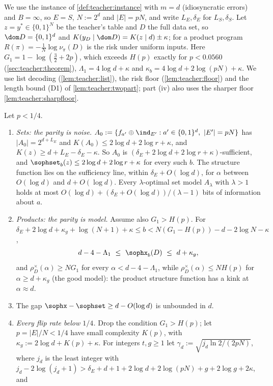 We use the instance of \cref{def:teacher:instance} with $m=d$ (idiosyncratic errors) and $B=\infty$, so $E=S$, $N:=2^d$ and $|E|=pN$, and write $L_E,\delta_E$ for $L_S,\delta_S$. Let $z=y^*\in\{0,1\}^N$ be the teacher's table and $D$ the full data set, so $\dom D=\{0,1\}^d$ and $K(y_D\mid\dom D)=K(z\mid d)\pm\kappa$; for a product program $R(\pi)=-\frac1N\log\nu_\pi(D)$ is the risk under uniform inputs. Here $G_1=1-\log(\frac32+2p)$, which exceeds $H(p)$ exactly for $p<0.0560$ (\cref{sec:teacher:theorem}), $\Lambda_1=4\log d+\kappa$ and $\kappa_b=4\log d+2\log(pN)+\kappa$. We use list decoding (\cref{lem:teacher:list}), the risk floor (\cref{lem:teacher:floor}) and the length bound (D1) of \cref{lem:teacher:twopart}; part (iv) also uses the sharper floor \cref{lem:teacher:sharpfloor}.

\begin{proposition}\label{prop:algstat:parity}
Let $p<1/4$.
\begin{enumerate}[label=(\roman*)]
\item \emph{Sets: the parity is noise.} $A_0:=\{f_{a'}\oplus\ind_{E'}:a'\in\{0,1\}^d,\ |E'|=pN\}$ has $|A_0|=2^{d+L_E}$ and $K(A_0)\le2\log d+2\log r+\kappa$, and $K(z)\ge d+L_E-\delta_E-\kappa$. So $A_0$ is $(\delta_E+2\log d+2\log r+\kappa)$-sufficient, and $\sophset_b(z)\le2\log d+2\log r+\kappa$ for every such $b$. The structure function lies on the sufficiency line, within $\delta_E+O(\log d)$, for $\alpha$ between $O(\log d)$ and $d+O(\log d)$. Every $\lambda$-optimal set model $A_\lambda$ with $\lambda>1$ holds at most $O(\log d)+(\delta_E+O(\log d))/(\lambda-1)$ bits of information about $a$.
\item \emph{Products: the parity is model.} Assume also $G_1>H(p)$. For $\delta_E+2\log d+\kappa_g+\log(N+1)+\kappa\le b<N(G_1-H(p))-d-2\log N-\kappa$,
\[
d-4-\Lambda_1\ \le\ \sophx_b(D)\ \le\ d+\kappa_g,
\]
and $\rho^\times_D(\alpha)\ge NG_1$ for every $\alpha<d-4-\Lambda_1$, while $\rho^\times_D(\alpha)\le NH(p)$ for $\alpha\ge d+\kappa_g$ (the good model): the product structure function has a kink at $\alpha\approx d$.
\item The gap $\sophx-\sophset\ge d-O(\log d)$ is unbounded in $d$.
\item \emph{Every flip rate below $1/4$.} Drop the condition $G_1>H(p)$; let $p=|E|/N<1/4$ have small complexity $K(p)$, with $\kappa_g:=2\log d+K(p)+\kappa$. For integers $t,g\ge1$ let $\gamma_d:=\sqrt{j_d\ln2/(2pN)}$, where $j_d$ is the least integer with $j_d-2\log(j_d+1)>\delta_E+d+1+2\log d+2\log(pN)+g+2\log g+2\kappa$, and

\end{enumerate}
\end{proposition}
